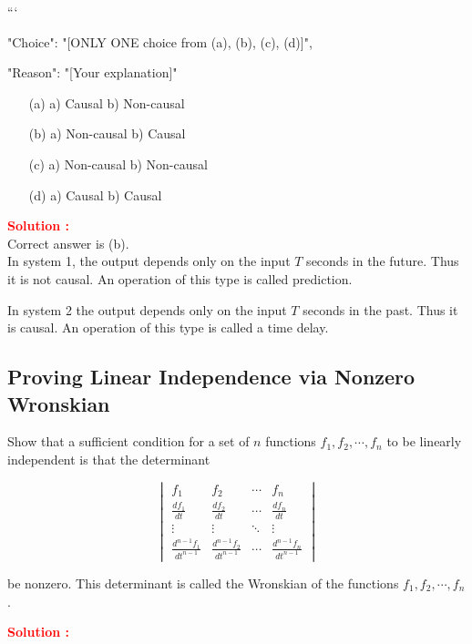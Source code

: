 \documentclass[12pt]{article}
\begin{document}
```
{

"Choice": "[ONLY ONE choice from (a), (b), (c), (d)]",

"Reason": "[Your explanation]"

}

\begin{itemize}
    \item[(a)] a) Causal b) Non-causal
    \item[(b)] a) Non-causal b) Causal
    \item[(c)] a) Non-causal b) Non-causal
    \item[(d)] a) Causal b) Causal
\end{itemize}

\textbf{\textcolor{red}{Solution :}} \\
Correct answer is (b).\\
In system 1, the output depends only on the input \(T\) seconds in the future. Thus it is not causal. An operation of this type is called prediction.

In system 2 the output depends only on the input \(T\) seconds in the past. Thus it is causal. An operation of this type is called a time delay.

\clearpage
\subsection{Proving Linear Independence via Nonzero Wronskian}

Show that a sufficient condition for a set of \(n\) functions \(f_1,f_2,\cdots,f_n\) to be linearly independent is that the determinant 


\begin{equation}
    \begin{vmatrix}
f_1 & f_2 & \cdots & f_n \\
\frac{df_1}{dt} & \frac{df_2}{dt} & \cdots & \frac{df_n}{dt} \\
\vdots & \vdots & \ddots & \vdots \\
\frac{d^{n-1}f_1}{dt^{n-1}} & \frac{d^{n-1}f_2}{dt^{n-1}} & \cdots & \frac{d^{n-1}f_n}{dt^{n-1}}
\end{vmatrix}
\end{equation}

be nonzero. This determinant is called the Wronskian of the functions \(f_1,f_2,\cdots,f_n\).

\textbf{\textcolor{red}{Solution :}} \\
\end{document}
